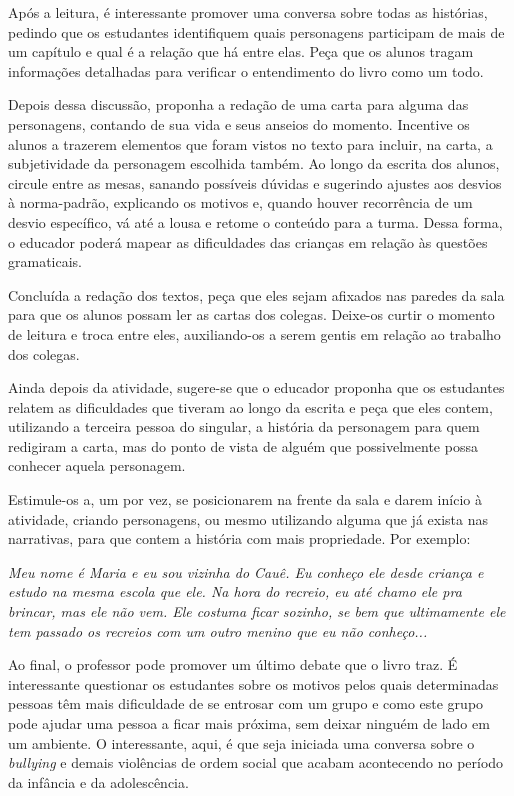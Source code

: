 \documentclass[11pt]{extarticle}
\begin{document}
Após a leitura, é interessante promover uma conversa sobre todas as histórias, pedindo que os estudantes identifiquem quais personagens participam de mais de um capítulo e qual é a relação que há entre elas. Peça que os alunos tragam informações detalhadas para verificar o entendimento do livro como um todo. 

Depois dessa discussão, proponha a redação de uma carta para alguma das personagens, contando de sua vida e seus anseios do momento. Incentive os alunos a trazerem elementos que foram vistos no texto para incluir, na carta, a subjetividade da personagem escolhida também. Ao longo da escrita dos alunos, circule entre as mesas, sanando possíveis dúvidas e sugerindo ajustes aos desvios à norma-padrão, explicando os motivos e, quando houver recorrência de um desvio específico, vá até a lousa e retome o conteúdo para a turma. Dessa forma, o educador poderá mapear as dificuldades das crianças em relação às questões gramaticais. 

Concluída a redação dos textos, peça que eles sejam afixados nas paredes da sala para que os alunos possam ler as cartas dos colegas. Deixe-os curtir o momento de leitura e troca entre eles, auxiliando-os a serem gentis em relação ao trabalho dos colegas.


Ainda depois da atividade, sugere-se que o educador proponha que os estudantes relatem as dificuldades que tiveram ao longo da escrita e peça que eles contem, utilizando a terceira pessoa do singular, a história da personagem para quem redigiram a carta, mas do ponto de vista de alguém que possivelmente possa conhecer aquela personagem. 

Estimule-os a, um por vez, se posicionarem na frente da sala e darem início à atividade, criando personagens, ou mesmo utilizando alguma que já exista nas narrativas, para que contem a história com mais propriedade. Por exemplo:

\textit{Meu nome é Maria e eu sou vizinha do Cauê. Eu conheço ele desde criança e estudo na mesma escola que ele. Na hora do recreio, eu até chamo ele pra brincar, mas ele não vem. Ele costuma ficar sozinho, se bem que ultimamente ele tem passado os recreios com um outro menino que eu não conheço...}


Ao final, o professor pode promover um último debate que o livro traz. É interessante questionar os estudantes sobre os motivos pelos quais determinadas pessoas têm mais dificuldade de se entrosar com um grupo e como este grupo pode ajudar uma pessoa a ficar mais próxima, sem deixar ninguém de lado em um ambiente. O interessante, aqui, é que seja iniciada uma conversa sobre o \textit{bullying} e demais violências de ordem social que acabam acontecendo no período da infância e da adolescência. 
\end{document}

